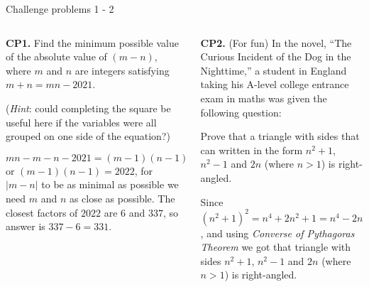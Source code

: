 \documentclass[9pt,aspectratio=169,handout]{beamer}
\begin{document}
\begin{frame}{Challenge problems 1 - 2}
  \begin{columns}[T]
    \begin{column}{0.5\textwidth}
      \begin{problem}
        \textbf{CP1.} Find the minimum possible value of the absolute value of $(m - n)$, where $m$ and $n$ are integers satisfying $m + n = mn - 2021$. 
        
        (\emph{Hint}: could completing the square be useful here if the variables were all grouped on one side of the equation?)
      \end{problem}
      $mn - m - n - 2021 = (m - 1)(n - 1) - 2022$ or $(m - 1)(n - 1) = 2022$, for $|m - n|$ to be as minimal as possible we need $m$ and $n$ as close as possible. The closest factors of $2022$ are $6$ and $337$, so answer is $337 - 6 = \boxed{331}$.
    \end{column}
    \begin{column}{0.5\textwidth}
      \begin{problem}
        \textbf{CP2.} (For fun) In the novel, “The Curious Incident of the Dog in the Nighttime,” a student in England taking his A-level college entrance exam in maths was given the following question: 
        
        Prove that a triangle with sides that can written in the form $n^2 +1$, $n^2 -1$ and $2n$ (where $n > 1$) is right-angled.
      \end{problem}
      Since $(n^2 + 1)^2 = n^4 + 2n^2 + 1 = n^4 - 2n^2 + 1 + 4n^2 = (n^2 - 1)^2 + (2n)^2$, and using \emph{Converse of Pythagoras Theorem} we got that triangle with sides  $n^2 +1$, $n^2 -1$ and $2n$ (where $n > 1$) is right-angled.
    \end{column}
  \end{columns}
\end{frame}
\end{document}
